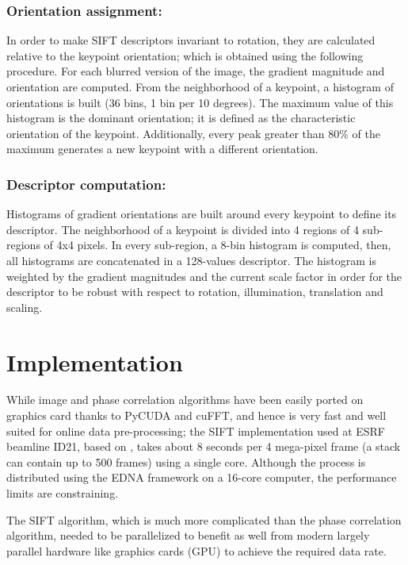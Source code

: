 \documentclass[preprint]{iucr}
\begin{document}
\subsubsection{Orientation assignment:}
In order to make SIFT descriptors invariant to rotation, they are calculated
relative to the keypoint orientation; which is obtained using the following
procedure.
For each blurred version of the image, the gradient magnitude and orientation
are computed.
From the neighborhood of a keypoint, a histogram of orientations is built (36
bins, 1 bin per 10 degrees).
The maximum value of this histogram is the dominant orientation; it is defined
as the characteristic orientation of the keypoint.
Additionally, every peak greater than 80\% of the maximum generates a new
keypoint with a different orientation.


\subsubsection{Descriptor computation:}
Histograms of gradient orientations are built around every keypoint to define
its descriptor.
The neighborhood of a keypoint is divided into 4 regions of 4 sub-regions of 4x4
pixels.
In every sub-region, a 8-bin histogram is computed, then, all histograms
are concatenated in a 128-values descriptor.
The histogram is weighted by the gradient magnitudes and the current scale
factor in order for the descriptor to be robust with respect to rotation,
illumination, translation and scaling.


\section{Implementation}

While image and phase correlation algorithms have been easily ported on
graphics card thanks to PyCUDA \cite{pyopencl} and cuFFT, and hence is very fast and well
suited for online data pre-processing;
the SIFT implementation used at ESRF beamline ID21, based on \cite{ASIFT},
takes about 8 seconds per 4 mega-pixel frame  (a stack can contain up to  500
frames) using a single core.
Although the process is distributed using the EDNA framework \cite{edna} on a
16-core computer, the performance limits are constraining.

The SIFT algorithm, which is much more complicated than the phase
correlation algorithm, needed to be parallelized to benefit as well from modern
largely parallel hardware like graphics cards (GPU) to achieve the required
data rate.
\end{document}
